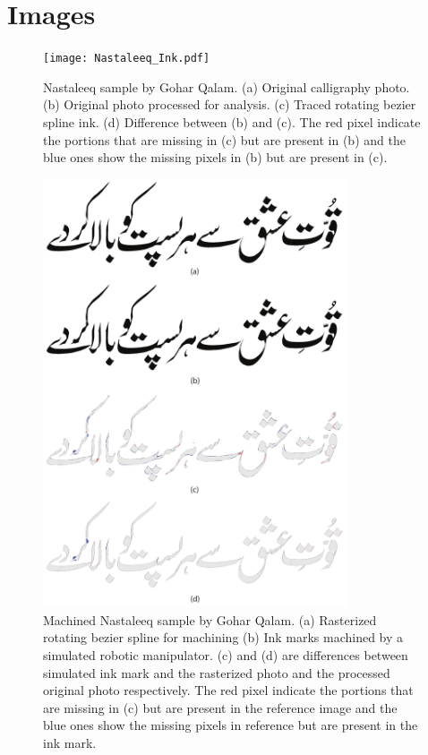 \section{Images}
{   

\begin{figure}[H]
  \centering
  \texttt{[image: Nastaleeq\_Ink.pdf]}
  \caption
  {
      Nastaleeq sample by Gohar Qalam. (a) Original calligraphy photo. (b) Original photo processed for analysis. (c) Traced rotating bezier spline ink. (d) Difference between (b) and (c). The red pixel indicate the portions that are missing in (c) but are present in (b) and the blue ones show the missing pixels in (b) but are present in (c).
  }
\end{figure}

\begin{figure}[H]
  \centering
  \includegraphics[width=0.8\textwidth]{Nastaleeq_Machined.pdf}
  \caption
  {
      Machined Nastaleeq sample by Gohar Qalam. (a) Rasterized rotating bezier spline for machining (b) Ink marks machined by a simulated robotic manipulator. (c) and (d) are differences between simulated ink mark and the rasterized photo and the processed original photo respectively. The red pixel indicate the portions that are missing in (c) but are present in the reference image and the blue ones show the missing pixels in reference but are present in the ink mark.
  }
\end{figure}

}
